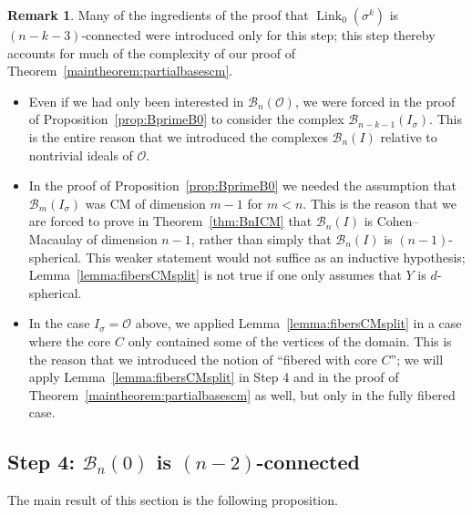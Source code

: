\documentclass[11 pt]{article}
\theoremstyle{plain}
\theoremstyle{definition}
\newtheorem{remark}[theorem]{Remark}
\numberwithin{equation}{section}
\renewcommand{\O}{\mathcal{O}}
\newcommand\PartialBases{\ensuremath{\mathcal{B}}}
\newcommand{\PB}{\PartialBases}
\DeclareMathOperator{\Link}{Link}
\begin{document}
\begin{remark}
\label{remark:trouble}
Many of the ingredients of the proof that $\Link_0(\sigma^k)$ is $(n-k-3)$-connected were introduced only for this step; this step thereby accounts for much of the complexity of our proof of Theorem~\ref{maintheorem:partialbasescm}.
\begin{itemize}[nosep]
\item Even if we had only been interested in $\PB_n(\O)$, we were forced in the proof of Proposition~\ref{prop:BprimeB0} to consider the complex $\PB_{n-k-1}(I_\sigma)$. This is the entire reason that we introduced the complexes $\PB_n(I)$ relative to nontrivial ideals of $\O$.
\item In the proof of Proposition~\ref{prop:BprimeB0} we needed the assumption that $\PB_m(I_\sigma)$ was CM of dimension $m-1$ for $m<n$. This is the reason that we are forced to prove in Theorem~\ref{thm:BnICM} that $\PB_n(I)$ is Cohen--Macaulay of dimension $n-1$, rather than simply that $\PB_n(I)$ is $(n-1)$-spherical. This weaker statement would not suffice as an inductive hypothesis; Lemma~\ref{lemma:fibersCMsplit} is not true if one only assumes that $Y$ is $d$-spherical.
\item In the case $I_\sigma=\O$ above, we applied Lemma~\ref{lemma:fibersCMsplit} in a case where the core $C$ only contained some of the vertices of the domain. This is the reason that we introduced the notion of ``fibered with core $C$''; we will apply Lemma~\ref{lemma:fibersCMsplit} in Step 4 and in the proof of Theorem~\ref{maintheorem:partialbasescm} 
as well, but only in the fully fibered case.
\end{itemize}
\end{remark}

\subsection{Step 4: \texorpdfstring{$\PB_n(0)$}{Bn(0)} is \texorpdfstring{$(n-2)$-connected}{(n-2)-connected}}
\label{section:step4}

The main result of this section is the following proposition. 
\end{document}
